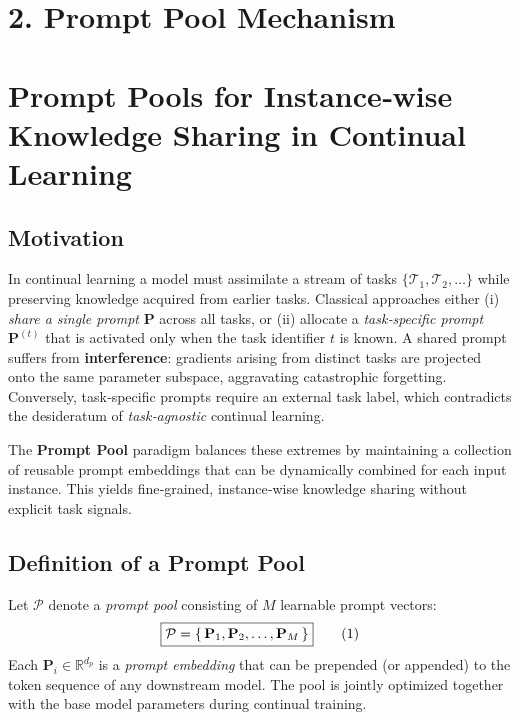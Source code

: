 \documentclass[12pt, a4paper]{article}
\begin{document}

\section{2. Prompt Pool Mechanism}
\section{Prompt Pools for Instance‑wise Knowledge Sharing in Continual Learning}

\subsection{Motivation}
In continual learning a model must assimilate a stream of tasks $\{\mathcal{T}_1,\mathcal{T}_2,\dots\}$ while preserving knowledge acquired from earlier tasks.  Classical approaches either (i) \emph{share a single prompt} $\mathbf{P}$ across all tasks, or (ii) allocate a \emph{task‑specific prompt} $\mathbf{P}^{(t)}$ that is activated only when the task identifier $t$ is known.  
A shared prompt suffers from \textbf{interference}: gradients arising from distinct tasks are projected onto the same parameter subspace, aggravating catastrophic forgetting.  Conversely, task‑specific prompts require an external task label, which contradicts the desideratum of \emph{task‑agnostic} continual learning.

The \textbf{Prompt Pool} paradigm balances these extremes by maintaining a collection of reusable prompt embeddings that can be dynamically combined for each input instance.  This yields fine‑grained, instance‑wise knowledge sharing without explicit task signals.

\subsection{Definition of a Prompt Pool}
Let $\mathcal{P}$ denote a \emph{prompt pool} consisting of $M$ learnable prompt vectors:
\begin{equation}
\boxed{%
\mathcal{P}= \{\,\mathbf{P}_1,\mathbf{P}_2,\dots,\mathbf{P}_M\,\}
}\tag{1}
\end{equation}
Each $\mathbf{P}_i\in\mathbb{R}^{d_p}$ is a \emph{prompt embedding} that can be prepended (or appended) to the token sequence of any downstream model.  The pool is jointly optimized together with the base model parameters during continual training.
\end{document}
